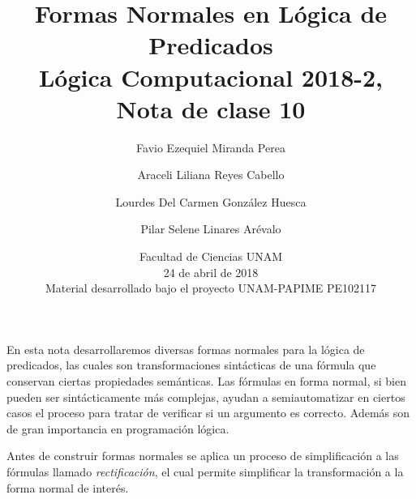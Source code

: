 \documentclass[11pt,letterpaper]{article}
\title{Formas Normales en Lógica de Predicados \\
L\'ogica Computacional 2018-2, Nota de clase 10}
\author{Favio Ezequiel Miranda Perea\and Araceli Liliana Reyes Cabello\and
Lourdes Del Carmen Gonz\'alez Huesca \and Pilar Selene Linares Ar\'evalo}
\date{Facultad de Ciencias UNAM \\ 24 de abril de 2018 \\
Material desarrollado bajo el proyecto UNAM-PAPIME PE102117}
\begin{document}
\maketitle



En esta nota desarrollaremos diversas formas normales para la lógica de
predicados, las cuales son transformaciones sintácticas de una f\'ormula que 
conservan ciertas propiedades sem\'anticas. Las fórmulas en forma normal, si
bien pueden ser sintácticamente más complejas, ayudan a semiautomatizar en
ciertos casos el proceso para tratar de verificar si un argumento es
correcto. Además son de gran importancia en programación lógica.

\bigskip

Antes de construir formas normales se aplica un proceso de
simplificación a las f\'ormulas llamado \emph{rectificaci\'on}, el cual permite 
simplificar la transformación a la forma normal de 
interés.

\end{document}
